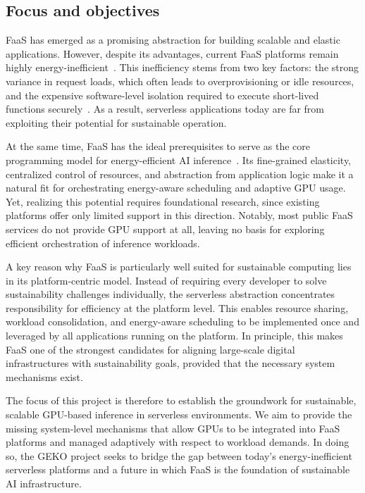 \subsection{Focus and objectives}

FaaS has emerged as a promising abstraction for building scalable and elastic applications.
However, despite its advantages, current FaaS platforms remain highly energy-inefficient~\cite{sharma_challenges_2023}. 
This inefficiency stems from two key factors: the strong variance in request loads, which often leads to overprovisioning or idle resources, and the expensive software-level isolation required to execute short-lived functions securely~\cite{schirmer2023nightshift,ginzburg_serverless_2020}.
As a result, serverless applications today are far from exploiting their potential for sustainable operation.

At the same time, FaaS has the ideal prerequisites to serve as the core programming model for energy-efficient AI inference~\cite{patros_2021_towards_sustainable_serverless}.
Its fine-grained elasticity, centralized control of resources, and abstraction from application logic make it a natural fit for orchestrating energy-aware scheduling and adaptive GPU usage. 
Yet, realizing this potential requires foundational research, since existing platforms offer only limited support in this direction. 
Notably, most public FaaS services do not provide GPU support at all, leaving no basis for exploring efficient orchestration of inference workloads.

A key reason why FaaS is particularly well suited for sustainable computing lies in its platform-centric model.
Instead of requiring every developer to solve sustainability challenges individually, the serverless abstraction concentrates responsibility for efficiency at the platform level.
This enables resource sharing, workload consolidation, and energy-aware scheduling to be implemented once and leveraged by all applications running on the platform.
In principle, this makes FaaS one of the strongest candidates for aligning large-scale digital infrastructures with sustainability goals, provided that the necessary system mechanisms exist.

The focus of this project is therefore to establish the groundwork for sustainable, scalable GPU-based inference in serverless environments.
We aim to provide the missing system-level mechanisms that allow GPUs to be integrated into FaaS platforms and managed adaptively with respect to workload demands.
In doing so, the GEKO project seeks to bridge the gap between today's energy-inefficient serverless platforms and a future in which FaaS is the foundation of sustainable AI infrastructure.


